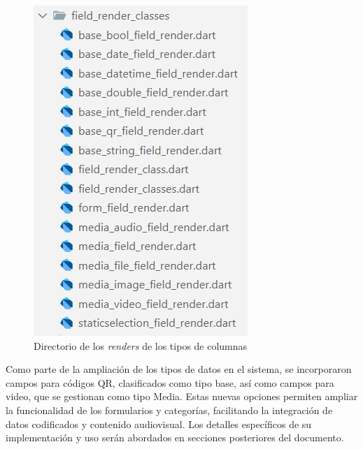 \documentclass{article}
\begin{document}
\begin{figure}[H]
\begin{minipage}[b]{0.3\textwidth}
    \includegraphics[width=\textwidth]{images/field_renders.jpg}
    \caption{Directorio de los \textit{renders} de los tipos de columnas}
    \label{fig:fieldrender}
  \end{minipage}
\end{figure}

Como parte de la ampliación de los tipos de datos en el sistema, se incorporaron campos para códigos QR, clasificados como tipo base, así como campos para video, que se gestionan como tipo Media. Estas nuevas opciones permiten ampliar la funcionalidad de los formularios y categorías, facilitando la integración de datos codificados y contenido audiovisual. Los detalles específicos de su implementación y uso serán abordados en secciones posteriores del documento.
\end{document}

